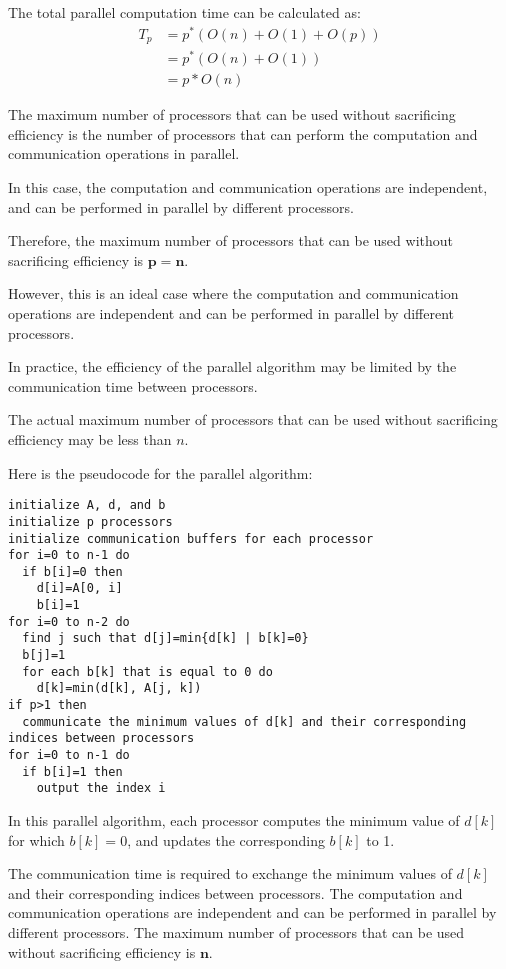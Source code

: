 \documentclass{article}
\begin{document}
The total parallel computation time can be calculated as:
\[
\begin{aligned}
T_p &= p^*(O(n)+O(1)+O(p)) \\
&= p^*(O(n)+O(1)) \\
&= p * O(n)
\end{aligned}
\]

The maximum number of processors that can be used without sacrificing efficiency is the number of processors that can perform the computation and communication operations in parallel.

In this case, the computation and communication operations are independent, and can be performed in parallel by different processors.

Therefore, the maximum number of processors that can be used without sacrificing efficiency is $\mathbf{p}=\mathbf{n}$.

However, this is an ideal case where the computation and communication operations are independent and can be performed in parallel by different processors.

In practice, the efficiency of the parallel algorithm may be limited by the communication time between processors.

The actual maximum number of processors that can be used without sacrificing efficiency may be less than $n$.

Here is the pseudocode for the parallel algorithm:
\begin{verbatim}
initialize A, d, and b
initialize p processors
initialize communication buffers for each processor
for i=0 to n-1 do
  if b[i]=0 then
    d[i]=A[0, i]
    b[i]=1
for i=0 to n-2 do
  find j such that d[j]=min{d[k] | b[k]=0}
  b[j]=1
  for each b[k] that is equal to 0 do
    d[k]=min(d[k], A[j, k])
if p>1 then
  communicate the minimum values of d[k] and their corresponding indices between processors
for i=0 to n-1 do
  if b[i]=1 then
    output the index i
\end{verbatim}

In this parallel algorithm, each processor computes the minimum value of $d[k]$ for which $b[k]=0$, and updates the corresponding $b[k]$ to 1.

The communication time is required to exchange the minimum values of $d[k]$ and their corresponding indices between processors.
The computation and communication operations are independent and can be performed in parallel by different processors.
The maximum number of processors that can be used without sacrificing efficiency is $\mathbf{n}$.
\end{document}
